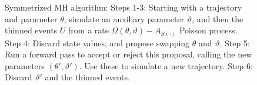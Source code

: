 \begin{figure}[h!]
\begin{minipage}[hp]{0.32\linewidth}
  \end{minipage}
    \caption{Symmetrized MH algorithm: Steps 1-3: Starting with a trajectory and parameter $\theta$, simulate an auxiliary parameter $\vartheta$, and then the thinned events
      $U$ from a rate $\Omega(\theta,\vartheta) - A_{S(\cdot)}$ Poisson
      process. Step 4: Discard state values, and propose swapping $\theta$ and $\vartheta$. Step 5:
      Run a forward pass to accept or reject this proposal, calling the new parameters $(\theta',\vartheta')$. 
    Use these to simulate a new trajectory. Step 6: Discard $\vartheta'$ and the thinned events.} 
   \label{fig:MH_improved}
  \end{figure}


